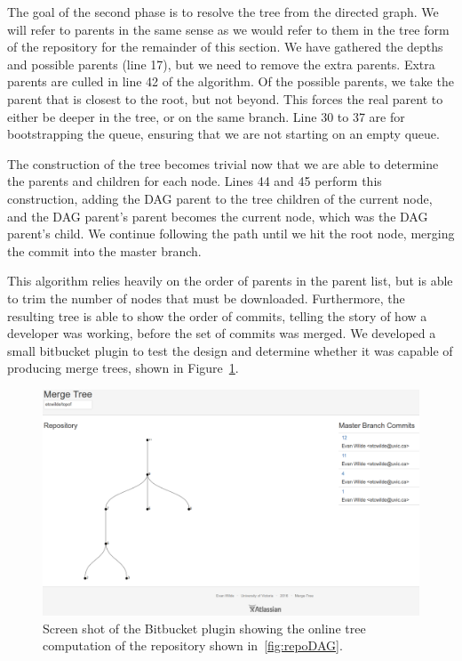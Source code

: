 The goal of the second phase is to resolve the tree from the directed
graph. We will refer to parents in the same sense as we would refer to
them in the tree form of the repository for the remainder of this
section. We have gathered the depths and possible parents (line 17), but
we need to remove the extra parents. Extra parents are culled in line
42 of the algorithm. Of the possible parents, we take the parent that is
closest to the root, but not beyond. This forces the real parent to
either be deeper in the tree, or on the same branch. Line 30 to 37 are
for bootstrapping the queue, ensuring that we are not starting on an
empty queue.

The construction of the tree becomes trivial now that we are able to
determine the parents and children for each node. Lines 44 and 45
perform this construction, adding the DAG parent to the tree children of the
current node, and the DAG parent's parent becomes the current node,
which was the DAG parent's child. We continue following the path until
we hit the root node, merging the commit into the master branch.

This algorithm relies heavily on the order of parents in the parent
list, but is able to trim the number of nodes that must be downloaded.
Furthermore, the resulting tree is able to show the order of commits,
telling the story of how a developer was working, before the set of
commits was merged. We developed a small bitbucket plugin to test the
design and determine whether it was capable of producing merge trees,
shown in Figure~\ref{fig:b_plugin}.

\begin{figure}[htpb]
  \centering
  \includegraphics[width=\linewidth]{figures/plugin.png}
  \caption{Screen shot of the Bitbucket plugin showing the online tree
    computation of the repository shown in~\ref{fig:repoDAG}.}
  \label{fig:b_plugin}
\end{figure}


